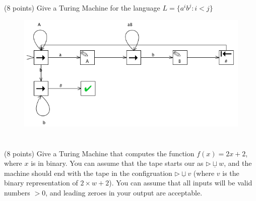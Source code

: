 \documentclass[paper=a4, fontsize=11pt]{scrartcl} %
\begin{document}
\maketitle %

\section{}

\begin{fancyquotes}
  (8 points) Give a Turing Machine for the language $L=\{a^ib^j:i<j\}$
\end{fancyquotes}

\begin{figure}[hp]
  \centering
  \includegraphics[width=\textwidth]{10-1.png}
\end{figure}

\pagebreak

\section{}

\begin{fancyquotes}
   (8 points) Give a Turing Machine that computes the function $f(x) =
   2x + 2$, where $x$ is in binary. You can assume that the tape
   starts our as $\rhd\underline{\sqcup}w$, and the machine should end
   with the tape in the configruation $\rhd\underline{\sqcup}v$ (where
   $v$ is the binary representation of $2\times w + 2$). You can
   assume that all inputs will be valid numbers $>0$, and leading
   zeroes in your output are acceptable.
\end{fancyquotes}
\end{document}
